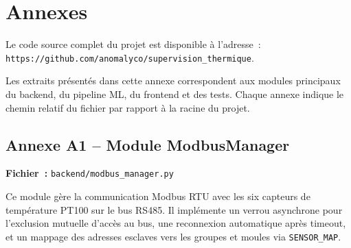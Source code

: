 \chapter{Annexes}

Le code source complet du projet est disponible à l'adresse~: \texttt{https://github.com/anomalyco/supervision\_thermique}.

Les extraits présentés dans cette annexe correspondent aux modules principaux du backend, du pipeline ML, du frontend et des tests. Chaque annexe indique le chemin relatif du fichier par rapport à la racine du projet.


\section{Annexe A1 -- Module ModbusManager}
\label{annexe:modbus}

\textbf{Fichier~:} \texttt{backend/modbus\_manager.py}

Ce module gère la communication Modbus RTU avec les six capteurs de température PT100 sur le bus RS485. Il implémente un verrou asynchrone pour l'exclusion mutuelle d'accès au bus, une reconnexion automatique après timeout, et un mappage des adresses esclaves vers les groupes et moules via \texttt{SENSOR\_MAP}.

